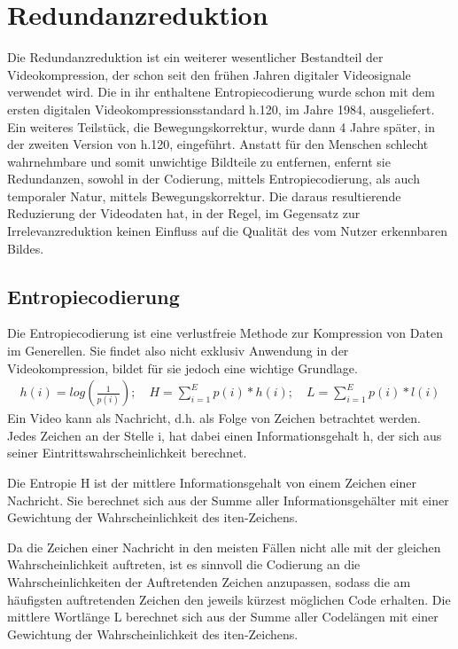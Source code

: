 \chapter{Redundanzreduktion}
\label{kap:Redundanzreduktion}
Die Redundanzreduktion ist ein weiterer wesentlicher Bestandteil der Videokompression, der schon seit den frühen Jahren digitaler Videosignale verwendet wird.
Die in ihr enthaltene Entropiecodierung wurde schon mit dem ersten digitalen Videokompressionsstandard h.120, im Jahre 1984, ausgeliefert. Ein weiteres Teilstück, die Bewegungskorrektur, wurde dann 4 Jahre später, in der zweiten Version von h.120, eingeführt. Anstatt für den Menschen schlecht wahrnehmbare und somit unwichtige Bildteile zu entfernen, enfernt sie Redundanzen, sowohl in der Codierung, mittels Entropiecodierung, als auch temporaler Natur, mittels Bewegungskorrektur. Die daraus resultierende Reduzierung der Videodaten hat, in der Regel, im Gegensatz zur Irrelevanzreduktion keinen Einfluss auf die Qualität des vom Nutzer erkennbaren Bildes.
\section{Entropiecodierung}
Die Entropiecodierung ist eine verlustfreie Methode zur Kompression von Daten im Generellen. Sie findet also nicht exklusiv Anwendung in der Videokompression, bildet für sie jedoch eine wichtige Grundlage.
\begin{align*}
h(i) = log(\frac{1}{p(i)});\quad H = \sum_{i=1}^E p(i) * h(i);\quad L = \sum_{i=1}^E p(i) * l(i)
\end{align*}
Ein Video kann als Nachricht, d.h. als Folge von Zeichen betrachtet werden. Jedes Zeichen an der Stelle i, hat dabei einen Informationsgehalt h, der sich aus seiner Eintrittswahrscheinlichkeit berechnet.

Die Entropie H ist der mittlere Informationsgehalt von einem Zeichen einer Nachricht.
Sie berechnet sich aus der Summe aller Informationsgehälter mit einer Gewichtung der Wahrscheinlichkeit des iten-Zeichens.

Da die Zeichen einer Nachricht in den meisten Fällen nicht alle mit der gleichen Wahrscheinlichkeit auftreten, ist es sinnvoll die Codierung an die Wahrscheinlichkeiten der Auftretenden Zeichen anzupassen, sodass die am häufigsten auftretenden Zeichen den jeweils kürzest möglichen Code erhalten.\cite{symes_peter_digital_2004}
Die mittlere Wortlänge L berechnet sich aus der Summe aller Codelängen mit einer Gewichtung der Wahrscheinlichkeit des iten-Zeichens.

